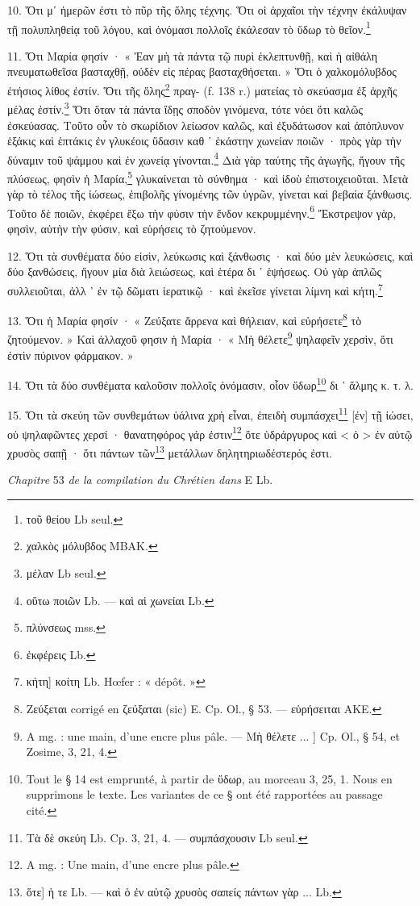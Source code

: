 \documentclass[a4paper, 11pt, oneside, polutonikogreek, french]{article}
\begin{document}
10. Ὅτι μʹ ἡμερῶν ἐστι τὸ πῦρ τῆς ὅλης τέχνης. Ὅτι οἱ ἀρχαῖοι τὴν τέχνην ἐκάλυψαν τῇ πολυπληθείᾳ τοῦ λόγου, καὶ ὀνόμασι πολλοῖς ἐκάλεσαν τὸ ὕδωρ τὸ θεῖον.\footnote{τοῦ θείου Lb seul.}

11. Ὅτι Μαρία φησίν · « Ἐαν μὴ τὰ πάντα τῷ πυρὶ ἐκλεπτυνθῇ, καὶ ἡ αἰθάλη πνευματωθεῖσα βασταχθῇ, οὐδὲν εἰς πέρας βασταχθήσεται. » Ὅτι ὁ χαλκομόλυβδος ἐτήσιος λίθος ἐστίν. Ὅτι τῆς ὅλης\footnote{χαλκὸς μόλυβδος MBAK.} πραγ- (f. 138 r.) ματείας τὸ σκεύασμα ἐξ ἀρχῆς μέλας ἐστίν.\footnote{μέλαν Lb seul.} Ὅτι ὅταν τὰ πάντα ἴδῃς σποδὸν γινόμενα, τότε νόει ὅτι καλῶς ἐσκεύασας. Τοῦτο οὖν τὸ σκωρίδιον λείωσον καλῶς, καὶ ἐξυδάτωσον καὶ ἀπόπλυνον ἑξάκις καὶ ἑπτάκις ἐν γλυκέοις ὕδασιν καθ ᾽ ἑκάστην χωνείαν ποιῶν · πρὸς γὰρ τὴν δύναμιν τοῦ ψάμμου καὶ ἐν χωνείᾳ γίνονται.\footnote{οὕτω ποιῶν Lb. --- καὶ αἱ χωνείαι Lb.} Διὰ γὰρ ταύτης τῆς ἀγωγῆς, ἤγουν τῆς πλύσεως, φησὶν ἡ Μαρία,\footnote{πλύνσεως mss.} γλυκαίνεται τὸ σύνθημα · καὶ ἰδοὺ ἐπιστοιχειοῦται. Μετὰ γὰρ τὸ τέλος τῆς ἰώσεως, ἐπιβολῆς γίνομένης τῶν ὑγρῶν, γίνεται καὶ βεβαία ξάνθωσις. Τοῦτο δὲ ποιῶν, ἐκφέρει ἔξω τὴν φύσιν τὴν ἔνδον κεκρυμμένην.\footnote{ἐκφέρεις Lb.} Ἔκστρεψον γὰρ, φησὶν, αὐτὴν τὴν φύσιν, καὶ εὑρήσεις τὸ ζητούμενον.

12. Ὅτι τὰ συνθέματα δύο εἰσὶν, λεύκωσις καὶ ξάνθωσις · καὶ δύο μὲν λευκώσεις, καὶ δύο ξανθώσεις, ἤγουν μία διὰ λειώσεως, καὶ ἑτέρα δι ᾽ ἑψήσεως. Οὐ γὰρ ἁπλῶς συλλειοῦται, ἀλλ ᾽ ἐν τῷ δῶματι ἱερατικῷ · καὶ ἐκεῖσε γίνεται λίμνη καὶ κήτη.\footnote{κήτη] κοίτη Lb. Hœfer : « dépôt. »}

13. Ὅτι ἡ Μαρία φησίν · « Ζεύξατε ἄρρενα καὶ θήλειαν, καὶ εὑρήσετε\footnote{Ζεύξεται corrigé en ζεύξαται (sic) E. Cp. Ol., § 53. --- εὑρήσειται AKE.} τὸ ζητούμενον. » Καὶ ἀλλαχοῦ φησιν ἡ Μαρία · « Μὴ θέλετε\footnote{A mg. : une main, d'une encre plus pâle. --- Μὴ θέλετε ... ] Cp. Ol., § 54, et Zosime, 3, 21, 4.} ψηλαφεῖν χερσὶν, ὅτι ἐστὶν πύρινον φάρμακον. »

14. Ὅτι τὰ δύο συνθέματα καλοῦσιν πολλοῖς ὀνόμασιν, οἷον ὕδωρ\footnote{Tout le § 14 est emprunté, à partir de ὕδωρ, au morceau 3, 25, 1. Nous en supprimons le texte. Les variantes de ce § ont été rapportées au passage cité.} δι ᾽ ἅλμης κ. τ. λ.

15. Ὅτι τὰ σκεύη τῶν συνθεμάτων ὑάλινα χρὴ εἶναι, ἐπειδὴ συμπάσχει\footnote{Τὰ δὲ σκεύη Lb. Cp. 3, 21, 4. --- συμπάσχουσιν Lb seul.} [ἐν] τῇ ἰώσει, οὐ ψηλαφῶντες χερσί · θανατηφόρος γάρ ἐστιν\footnote{A mg. : Une main, d'une encre plus pâle.} ὅτε ὑδράργυρος καὶ < ὁ > ἐν αὐτῷ χρυσὸς σαπῇ · ὅτι πάντων τῶν\footnote{ὅτε] ἡ τε Lb. --- καὶ ὁ ἐν αὐτῷ χρυσὸς σαπείς πάντων γὰρ ... Lb.} μετάλλων δηλητηριωδέστερός ἐστι.
\begin{center}
\emph{Chapitre} 53 \emph{de la compilation du Chrétien dans} E Lb.
\end{center}
\end{document}
